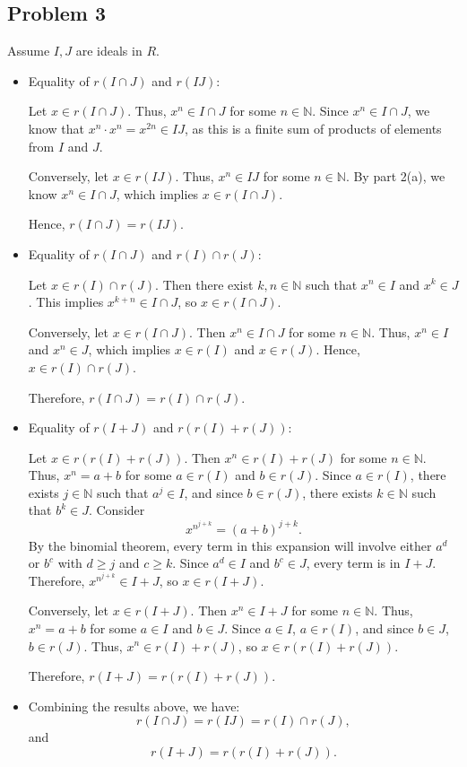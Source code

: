 \documentclass[12pt, letterpaper]{article}
\theoremstyle{definition}
\begin{document}
\newpage
\subsection*{Problem 3}
Assume $I, J$ are ideals in $R$.
\begin{itemize}
    \item Equality of $r(I \cap J)$ and $r(IJ)$:
    
    Let $x \in r(I \cap J)$. Thus, $x^n \in I \cap J$ for some $n \in \mathbb{N}$. Since $x^n \in I \cap J$, we know that $x^n \cdot x^n = x^{2n} \in IJ$, as this is a finite sum of products of elements from $I$ and $J$.
    
    Conversely, let $x \in r(IJ)$. Thus, $x^n \in IJ$ for some $n \in \mathbb{N}$. By part 2(a), we know $x^n \in I \cap J$, which implies $x \in r(I \cap J)$.
    
    Hence, $r(I \cap J) = r(IJ)$.
    
    \item Equality of $r(I \cap J)$ and $r(I) \cap r(J)$:
    
    Let $x \in r(I) \cap r(J)$. Then there exist $k, n \in \mathbb{N}$ such that $x^n \in I$ and $x^k \in J$. This implies $x^{k+n} \in I \cap J$, so $x \in r(I \cap J)$.
    
    Conversely, let $x \in r(I \cap J)$. Then $x^n \in I \cap J$ for some $n \in \mathbb{N}$. Thus, $x^n \in I$ and $x^n \in J$, which implies $x \in r(I)$ and $x \in r(J)$. Hence, $x \in r(I) \cap r(J)$.
    
    Therefore, $r(I \cap J) = r(I) \cap r(J)$.
    
    \item Equality of $r(I + J)$ and $r(r(I) + r(J))$:
    
    Let $x \in r(r(I) + r(J))$. Then $x^n \in r(I) + r(J)$ for some $n \in \mathbb{N}$. Thus, $x^n = a + b$ for some $a \in r(I)$ and $b \in r(J)$. Since $a \in r(I)$, there exists $j \in \mathbb{N}$ such that $a^j \in I$, and since $b \in r(J)$, there exists $k \in \mathbb{N}$ such that $b^k \in J$. Consider 
    \[
    x^{n^{j+k}} = (a+b)^{j+k}.
    \]
    By the binomial theorem, every term in this expansion will involve either $a^d$ or $b^c$ with $d \geq j$ and $c \geq k$. Since $a^d \in I$ and $b^c \in J$, every term is in $I + J$. Therefore, $x^{n^{j+k}} \in I + J$, so $x \in r(I + J)$.
    
    Conversely, let $x \in r(I + J)$. Then $x^n \in I + J$ for some $n \in \mathbb{N}$. Thus, $x^n = a + b$ for some $a \in I$ and $b \in J$. Since $a \in I$, $a \in r(I)$, and since $b \in J$, $b \in r(J)$. Thus, $x^n \in r(I) + r(J)$, so $x \in r(r(I) + r(J))$.
    
    Therefore, $r(I + J) = r(r(I) + r(J))$.
    
    \item Combining the results above, we have:
    \[
    r(I \cap J) = r(IJ) = r(I) \cap r(J),
    \]
    and
    \[
    r(I + J) = r(r(I) + r(J)).
    \]
    
\end{itemize}
\newpage
\end{document}
